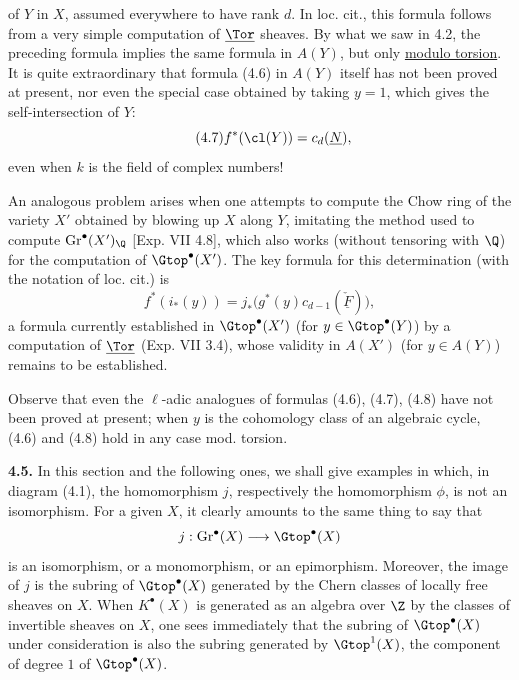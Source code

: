 %
of $Y$ in $X$, assumed everywhere to have rank $d$. In loc. cit., this formula follows from a very simple computation of $\underline{\Tor}$ sheaves. By what we saw in 4.2, the preceding formula implies the same formula in $A(Y)$, but only \uline{modulo torsion}. It is quite extraordinary that formula (4.6) in $A(Y)$ itself has not been proved at present, nor even the special case obtained by taking $y=1$, which gives the self-intersection of $Y$:
\begin{equation}\tag{4.7}
 f^*(\cl(Y))=c_d(\underline{N}),
\end{equation}
even when $k$ is the field of complex numbers!

An analogous problem arises when one attempts to compute the Chow ring of the variety $X'$ obtained by blowing up $X$ along $Y$, imitating the method used to compute $\operatorname{Gr}^\bullet(X')_\Q$ [Exp. VII 4.8], which also works (without tensoring with $\Q$) for the computation of $\Gtop^\bullet(X')$. The key formula for this determination (with the notation of loc. cit.) is
\begin{equation}\tag{4.8}
 f^*(i_*(y))=j_*\bigl(g^*(y)c_{d-1}(\check{\underline F})\bigr),
\end{equation}
a formula currently established in $\Gtop^\bullet(X')$ (for $y\in\Gtop^\bullet(Y)$) by a computation of $\underline{\Tor}$ (Exp. VII 3.4), whose validity in $A(X')$ (for $y\in A(Y)$) remains to be established.

Observe that even the $\ell$-adic analogues of formulas (4.6), (4.7), (4.8) have not been proved at present; when $y$ is the cohomology class of an algebraic cycle, (4.6) and (4.8) hold in any case mod. torsion.

\textbf{4.5.} In this section and the following ones, we shall give examples in which, in diagram (4.1), the homomorphism $j$, respectively the homomorphism $\phi$, is not an isomorphism. For a given $X$, it clearly amounts to the same thing to say that
\[
 j:\operatorname{Gr}^\bullet(X)\longrightarrow \Gtop^\bullet(X)
\]
is an isomorphism, or a monomorphism, or an epimorphism. Moreover, the image of $j$ is the subring of $\Gtop^\bullet(X)$ generated by the Chern classes of locally free sheaves on $X$. When $K^\bullet(X)$ is generated as an algebra over $\Z$ by the classes of invertible sheaves on $X$, one sees immediately that the subring of $\Gtop^\bullet(X)$ under consideration is also the subring generated by $\Gtop^1(X)$, the component of degree $1$ of $\Gtop^\bullet(X)$.

